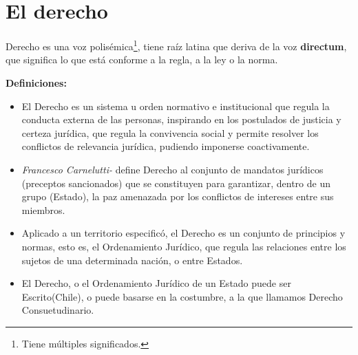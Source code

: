 \documentclass{templateApunte}
\newcommand{\newparagraph}{\par\vspace{\baselineskip}\noindent}
\begin{document}
\newpage
\section{El derecho}
Derecho es una voz polisémica\footnote{Tiene múltiples significados.}, tiene raíz latina que deriva de la voz \textbf{directum}, que significa lo que est\'a conforme a la regla, a la ley o la norma.
\newparagraph
\textbf{Definiciones:}
\begin{itemize}
  \item El Derecho es un sistema u orden normativo e institucional que regula la conducta externa de las personas, inspirando en los postulados de justicia y certeza jurídica, que regula la convivencia social y permite resolver los conflictos de relevancia jurídica, pudiendo imponerse coactivamente.
  \item \textit{Francesco Carnelutti-} define Derecho al conjunto de mandatos jurídicos (preceptos sancionados) que se constituyen para garantizar, dentro de un grupo (Estado), la paz amenazada por los conflictos de intereses entre sus miembros.
  \item Aplicado a un territorio especificó, el Derecho es un conjunto de principios y normas, esto es, el Ordenamiento Jurídico, que regula las relaciones entre los sujetos de una determinada nación, o entre Estados.
  \item El Derecho, o el Ordenamiento Jurídico de un Estado puede ser Escrito(Chile), o puede basarse en la costumbre, a la que llamamos Derecho Consuetudinario.
\end{itemize}
\end{document}
